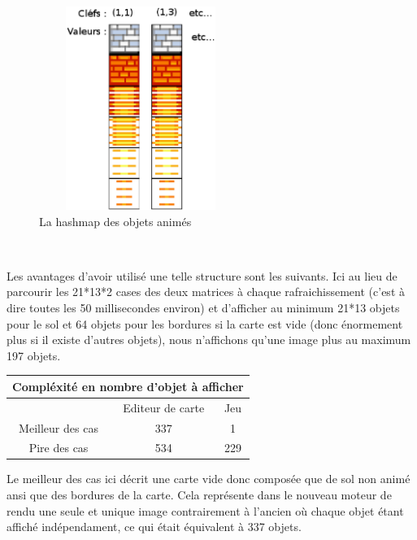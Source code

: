 			\begin{figure}[!h]			
				\begin{center}						
					\includegraphics[width=250px, height=250px]{Developpement/Img/hashmap.eps}
					\caption{La hashmap des objets animés}
				\end{center}
			\end{figure}

			$\,$
			
			\newpage

			Les avantages d'avoir utilisé une telle structure sont les suivants. Ici au
			lieu de parcourir les 21*13*2 cases des deux matrices à chaque rafraichissement
			(c'est à dire toutes les 50 millisecondes environ) et d'afficher au minimum
			21*13 objets pour le sol et 64 objets pour les bordures si la carte est vide
			(donc énormement plus si il existe d'autres objets), nous n'affichons qu'une
			image plus au maximum 197 objets.
			
			\begin{center}
				\begin{tabular}{|c|c|c|} \hline
				\multicolumn{3}{c}{Compléxité en nombre d'objet à afficher} \\\hline
				  & Editeur de carte & Jeu    \\\hline 
				Meilleur des cas & 337 & 1    \\\hline
				Pire des cas     & 534 & 229  \\\hline		
				\end{tabular}
			\end{center}
			
			Le meilleur des cas ici décrit une carte vide donc composée que de sol non
			animé ansi que des bordures de la carte. Cela représente dans le nouveau
			moteur de rendu une seule et unique image contrairement à l'ancien où chaque
			objet étant affiché indépendament, ce qui était équivalent à 337 objets.
			
